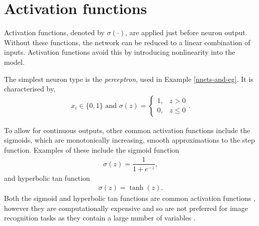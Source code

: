 \section{Activation functions}\label{nnets-act}

Activation functions, denoted by $\sigma(\cdot)$, are applied just before neuron output. Without these functions, the network can be reduced to a linear combination of inputs. Activation functions avoid this by introducing nonlinearity into the model.

The simplest neuron type is the \textit{perceptron}, used in Example \ref{nnets-and-eg}. It is characterised by,
\begin{align}
	x_i \in \{0,1\} \text{ and } \sigma(z) = \begin{cases}
		1, & z > 0 \\
		0, & z \le 0
	\end{cases}.
\end{align}

To allow for continuous outputs, other common activation functions include the sigmoids, which are monotonically increasing, smooth approximations to the step function. Examples of these include the sigmoid function
\begin{align}
	\sigma(z) = \dfrac{1}{1+e^{-z}},
\end{align}
and hyperbolic tan function
\begin{align}
	\sigma(z) = \tanh(z).
\end{align}
Both the sigmoid and hyperbolic tan functions are common activation functions \citep{Goodfellow-et-al-2016}, however they are computationally expensive and so are not preferred for image recognition tasks as they contain a large number of variables \citep{LeCun2012, Nielson2015}.

